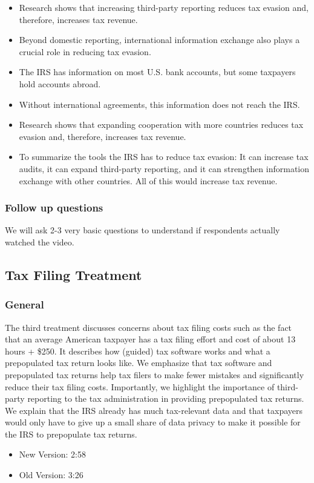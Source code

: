 \documentclass[11pt]{article}
\begin{document}
\begin{itemize}
\item Research shows that increasing third-party reporting reduces tax evasion and, therefore, increases tax revenue.
\item Beyond domestic reporting, international information exchange also plays a crucial role in reducing tax evasion. 
\item The IRS has information on most U.S. bank accounts, but some taxpayers hold accounts abroad.
\item Without international agreements, this information does not reach the IRS.
\item Research shows that expanding cooperation with more countries reduces tax evasion and, therefore, increases tax revenue.
\item To summarize the tools the IRS has to reduce tax evasion: It can increase tax audits, it can expand third-party reporting, and it can strengthen information exchange with other countries. All of this would increase tax revenue. 
\end{itemize}

\subsubsection*{Follow up questions}
We will ask 2-3 very basic questions to understand if respondents actually watched the video.
\subsection{Tax Filing Treatment}
\subsubsection*{General}
The third treatment discusses concerns about tax filing costs such as the fact that an average American taxpayer has a tax filing effort and cost of about 13 hours + \$250. It describes how (guided) tax software works and what a prepopulated tax return looks like. We emphasize that tax software and prepopulated tax returns help tax filers to make fewer mistakes and significantly reduce their tax filing costs. Importantly, we highlight the importance of third-party reporting to the tax administration in providing prepopulated tax returns. We explain that the IRS already has much tax-relevant data and that taxpayers would only have to give up a small share of data privacy to make it possible for the IRS to prepopulate tax returns. 
\\
\begin{itemize}
    \item New Version: 2:58
    \item Old Version: 3:26
\end{itemize}
\end{document}
